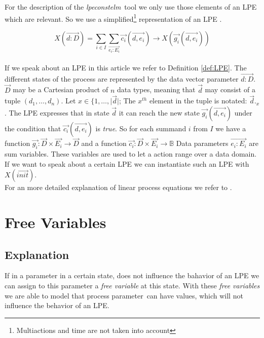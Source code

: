 \index{}\documentclass[a4paper,10pt]{article}
\theoremstyle{plain}
\theoremstyle{definition}
\newcommand{\lpe}{linear process equation}
\newcommand{\tool}{\textit{lpeconstelm}}
\newcommand{\ovr}{\overrightarrow}
\newcommand{\mcrl}{mCRL2}
\newcommand{\pp}{process parameter}
\newcommand{\ti}{\textit}
\begin{document}
\noindent For the description of the \tool\ tool we only use those elements of an LPE which are relevant. So we use a simplified\footnote{Multiactions and time are not taken into account} representation of an LPE .
\begin{defn}\label{def:LPE}
\begin{displaymath}
X (\ovr{d:D}) = \sum_{i \in I} \sum_{\ovr{e_i:E_i}} \ovr{c_i} ( \ovr{d, e_i}) \rightarrow X(\ovr{g_i}(\ovr{d,e_i}))
\end{displaymath}\\
If we speak about an LPE in this article we refer to Definition \ref{def:LPE}.  The different states 
of the process are represented by the data vector parameter $\ovr{d: D}$. $\ovr{D}$ may be a Cartesian product of $n$ data types, meaning that $\ovr{d}$ may consist of a tuple $(d_1, \ldots, d_n)$. 
Let $x \in \lbrace 1, \ldots , \vert \ovr{d} \vert$; The $x^{th}$ element in the tuple is notated: $\ovr{d}._x$.
The LPE expresses that in state $\ovr{d}$ %
it can reach the new state $\ovr{g_i}(\ovr{d,e_i})$ under the condition that $\ovr{c_i}(\ovr{d,e_i})$ is \ti{true}. So for each summand $i$ from $I$ we have a function $\ovr{g_i}: \ovr{D} \times \ovr{E_i} \rightarrow \ovr{D}$ and a function $\ovr{c_i}: \ovr{D} \times \ovr{E_i} \rightarrow \mathbb{B}$
Data parameters $\ovr{e_i : E_i}$ are sum variables. These variables are used to let a action range over a data domain. 
If we want to speak about a certain LPE we can instantiate such an LPE with $X(\ovr{init})$. \\

\noindent For an more detailed explanation of \lpe s  we refer to \cite{LPE_info}.
\end{defn}

\section{Free Variables}
\subsection{Explanation}

If in a parameter in a certain state, does not influence the bahavior of an LPE we can assign to this parameter a \ti{free variable} at this state. With these \ti{free variables} we are able to model that \pp\ can have values, which will not influence the behavior of an LPE. %
\end{document}
